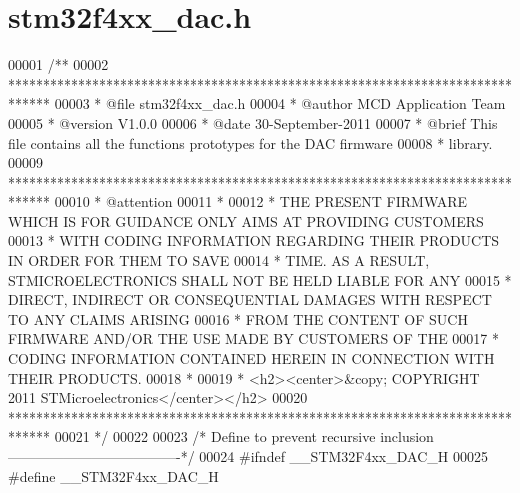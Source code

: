 \section{stm32f4xx\+\_\+dac.\+h}
\label{stm32f4xx__dac_8h_source}

\begin{DoxyCode}
00001 \textcolor{comment}{/**}
00002 \textcolor{comment}{  ******************************************************************************}
00003 \textcolor{comment}{  * @file    stm32f4xx\_dac.h}
00004 \textcolor{comment}{  * @author  MCD Application Team}
00005 \textcolor{comment}{  * @version V1.0.0}
00006 \textcolor{comment}{  * @date    30-September-2011}
00007 \textcolor{comment}{  * @brief   This file contains all the functions prototypes for the DAC firmware }
00008 \textcolor{comment}{  *          library.}
00009 \textcolor{comment}{  ******************************************************************************}
00010 \textcolor{comment}{  * @attention}
00011 \textcolor{comment}{  *}
00012 \textcolor{comment}{  * THE PRESENT FIRMWARE WHICH IS FOR GUIDANCE ONLY AIMS AT PROVIDING CUSTOMERS}
00013 \textcolor{comment}{  * WITH CODING INFORMATION REGARDING THEIR PRODUCTS IN ORDER FOR THEM TO SAVE}
00014 \textcolor{comment}{  * TIME. AS A RESULT, STMICROELECTRONICS SHALL NOT BE HELD LIABLE FOR ANY}
00015 \textcolor{comment}{  * DIRECT, INDIRECT OR CONSEQUENTIAL DAMAGES WITH RESPECT TO ANY CLAIMS ARISING}
00016 \textcolor{comment}{  * FROM THE CONTENT OF SUCH FIRMWARE AND/OR THE USE MADE BY CUSTOMERS OF THE}
00017 \textcolor{comment}{  * CODING INFORMATION CONTAINED HEREIN IN CONNECTION WITH THEIR PRODUCTS.}
00018 \textcolor{comment}{  *}
00019 \textcolor{comment}{  * <h2><center>&copy; COPYRIGHT 2011 STMicroelectronics</center></h2>}
00020 \textcolor{comment}{  ******************************************************************************}
00021 \textcolor{comment}{  */}
00022 
00023 \textcolor{comment}{/* Define to prevent recursive inclusion -------------------------------------*/}
00024 \textcolor{preprocessor}{#}\textcolor{preprocessor}{ifndef} \textcolor{preprocessor}{\_\_STM32F4xx\_DAC\_H}
00025 \textcolor{preprocessor}{#}\textcolor{preprocessor}{define} \textcolor{preprocessor}{\_\_STM32F4xx\_DAC\_H}

\end{DoxyCode}
